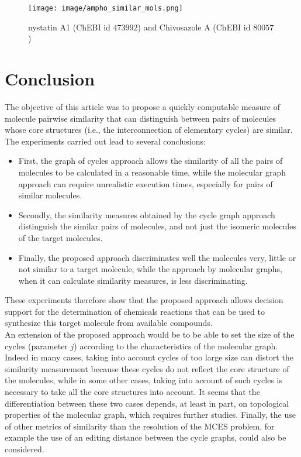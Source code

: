 \documentclass[journal=jacsat,manuscript=article]{achemso}
\begin{document}
 \begin{figure}[H]
 \begin{center}
\texttt{[image: image/ampho\_similar\_mols.png]}
\end{center}
\caption{nystatin A1 (ChEBI id $ 473992$) and Chivosazole A (ChEBI id $80057$)}
 \label{similarampho}
 \end{figure}
 
 
 
 \section{Conclusion}
 
 
 The objective of this article was to propose a quickly computable measure of molecule pairwise similarity that can distinguish between pairs of molecules whose core structures (i.e., the interconnection of elementary cycles) are similar. The experiments carried out lead to several conclusions:

\begin{itemize}

\item First, the graph of cycles approach allows the similarity of all the pairs of molecules to be calculated in a reasonable time, while the molecular graph approach can require unrealistic execution times, especially for pairs of similar molecules.

\item Secondly, the similarity measures obtained by the cycle graph approach distinguish the similar pairs of molecules, and not just the isomeric molecules of the target molecules.

\item Finally, the proposed approach discriminates well the molecules very, little or not similar to a target molecule, while the approach by molecular graphs, when it can calculate similarity measures, is less discriminating.

\end{itemize}

These experiments therefore show that the proposed approach allows decision support for the determination of chemicals reactions that can be used to synthesize this target molecule from available compounds.\\

An extension of the proposed approach would be to be able to set the size of the cycles (parameter $j$) according to the characteristics of the molecular graph. Indeed in many cases, taking into account cycles of too large size can distort the similarity measurement because these cycles do not reflect the core structure of the molecules, while in some other cases, taking into account of such cycles is necessary to take all the core structures into account. It seems that the differentiation between these two cases depends, at least in part, on topological properties of the molecular graph, which requires further studies. Finally, the use of other metrics of similarity than the resolution of the MCES problem, for example the use of an editing distance between the cycle graphs, could also be considered.
\end{document}
